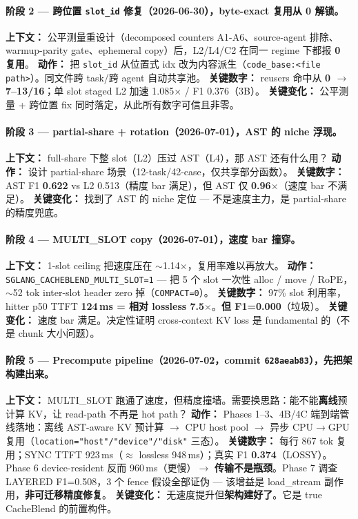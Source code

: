 \documentclass[11pt,a4paper]{article}
\begin{document}
\paragraph{阶段 2 --- 跨位置 \texttt{slot\_id} 修复（2026-06-30），byte-exact 复用从 0 解锁。}
\textbf{上下文：} 公平测量重设计（decomposed counters A1-A6、source-agent 排除、warmup-parity gate、ephemeral copy）后，L2/L4/C2 在同一 regime 下都报 \textbf{0 复用}。
\textbf{动作：} 把 \texttt{slot\_id} 从位置式 idx 改为内容派生（\texttt{code\_base:<file path>}）。同文件跨 task/跨 agent 自动共享池。
\textbf{关键数字：} reusers 命中从 \textbf{0 $\to$ 7--13/16}；单 slot staged L2 加速 1.085$\times$ / F1 0.376（3B）。
\textbf{关键变化：} 公平测量 + 跨位置 fix 同时落定，从此所有数字可信且非零。

\paragraph{阶段 3 --- partial-share + rotation（2026-07-01），AST 的 niche 浮现。}
\textbf{上下文：} full-share 下整 slot（L2）压过 AST（L4），那 AST 还有什么用？
\textbf{动作：} 设计 partial-share 场景（12-task/42-case，仅共享部分函数）。
\textbf{关键数字：} AST F1 \textbf{0.622} vs L2 0.513（精度 bar 满足），但 AST 仅 \textbf{0.96$\times$}（速度 bar 不满足）。
\textbf{关键变化：} 找到了 AST 的 niche 定位 --- 不是速度主力，是 partial-share 的精度兜底。

\paragraph{阶段 4 --- MULTI\_SLOT copy（2026-07-01），速度 bar 撞穿。}
\textbf{上下文：} 1-slot ceiling 把速度压在 $\sim$1.14$\times$，复用率难以再放大。
\textbf{动作：} \texttt{SGLANG\_CACHEBLEND\_MULTI\_SLOT=1} --- 把 5 个 slot 一次性 alloc / move / RoPE，$\sim$52 tok inter-slot header zero 掉（\texttt{COMPACT=0}）。
\textbf{关键数字：} 97\% slot 利用率，hitter p50 TTFT \textbf{124\,ms = 相对 lossless 7.5$\times$}。\textbf{但 F1=0.000}（垃圾）。
\textbf{关键变化：} 速度 bar 满足。决定性证明 cross-context KV loss 是 fundamental 的（不是 chunk 大小问题）。

\paragraph{阶段 5 --- Precompute pipeline（2026-07-02，commit \texttt{628aeab83}），先把架构建出来。}
\textbf{上下文：} MULTI\_SLOT 跑通了速度，但精度撞墙。需要换思路：能不能\textbf{离线}预计算 KV，让 read-path 不再是 hot path？
\textbf{动作：} Phases 1--3、4B/4C 端到端管线落地：离线 AST-aware KV 预计算 $\to$ CPU host pool $\to$ 异步 CPU$\to$GPU 复用（\texttt{location="host"/"device"/"disk"} 三态）。
\textbf{关键数字：} 每行 867 tok 复用；SYNC TTFT 923\,ms（$\approx$ lossless 948\,ms）；真实 F1 \textbf{0.374}（LOSSY）。Phase 6 device-resident 反而 960\,ms（更慢）$\to$ \textbf{传输不是瓶颈}。Phase 7 调查 LAYERED F1=0.508，3 个 fence 假设全部证伪 --- 该增益是 load\_stream 副作用，\textbf{非可迁移精度修复}。
\textbf{关键变化：} 无速度提升但\textbf{架构建好了}。它是 true CacheBlend 的前置构件。
\end{document}
